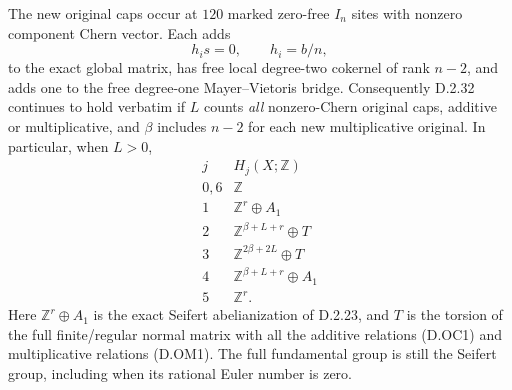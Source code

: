 The new original caps occur at $120$ marked zero-free
$I_n$ sites with nonzero component Chern vector. Each adds
\[
 h_i s=0,\qquad h_i=b/n,                                   \tag{D.OM1}
\]
to the exact global matrix, has free local degree-two
cokernel of rank $n-2$, and adds one to the free
degree-one Mayer--Vietoris bridge. Consequently D.2.32
continues to hold verbatim if $L$ counts \emph{all}
nonzero-Chern original caps, additive or multiplicative,
and $\beta$ includes $n-2$ for each new multiplicative
original. In particular, when $L>0$,
\[
\begin{array}{c|c}
j&H_j(X;\mathbb Z)\\\hline
0,6&\mathbb Z\\
1&\mathbb Z^r\oplus A_1\\
2&\mathbb Z^{\beta+L+r}\oplus T\\
3&\mathbb Z^{2\beta+2L}\oplus T\\
4&\mathbb Z^{\beta+L+r}\oplus A_1\\
5&\mathbb Z^r.
\end{array}                                                \tag{D.OM2}
\]
Here $\mathbb Z^r\oplus A_1$ is the exact Seifert
abelianization of D.2.23, and $T$ is the torsion of the
full finite/regular normal matrix with all the additive
relations (D.OC1) and multiplicative relations (D.OM1).
The full fundamental group is still the Seifert group,
including when its rational Euler number is zero.

